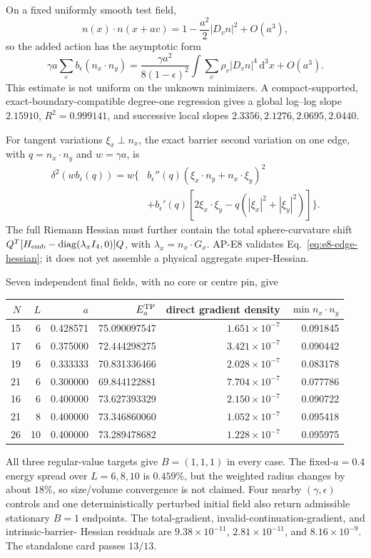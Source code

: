 \documentclass[11pt]{article}
\numberwithin{equation}{section}
\newcommand{\dd}{\mathrm d}
\begin{document}
On a fixed uniformly smooth test field,
\begin{equation}
 n(x)\cdot n(x+av)=1-\frac{a^2}{2}|D_vn|^2+O(a^3),
\end{equation}
so the added action has the asymptotic form
\begin{equation}
 \gamma a\sum_e b_\epsilon(n_x\cdot n_y)
 =\frac{\gamma a^2}{8(1-\epsilon)^2}
 \int\sum_v\rho_v|D_vn|^4\,\dd^3x+O(a^3).
 \label{eq:e8-smooth-scaling}
\end{equation}
This estimate is not uniform on the unknown minimizers.  A compact-supported,
exact-boundary-compatible degree-one regression gives a global log--log slope
\(2.15910\), \(R^2=0.999141\), and successive local slopes
\(2.3356,2.1276,2.0695,2.0440\).

For tangent variations \(\xi_x\perp n_x\), the exact barrier second variation
on one edge, with \(q=n_x\cdot n_y\) and \(w=\gamma a\), is
\begin{align}
 \delta^2(wb_\epsilon(q))=w\{&b_\epsilon''(q)
 (\xi_x\cdot n_y+n_x\cdot\xi_y)^2\nonumber\\
 &+b_\epsilon'(q)[2\xi_x\cdot\xi_y
 -q(|\xi_x|^2+|\xi_y|^2)]\}.
 \label{eq:e8-edge-hessian}
\end{align}
The full Riemann Hessian must further contain the total sphere-curvature shift
\(Q^T[H_{\rm emb}-\operatorname{diag}(\lambda_xI_4,0)]Q\), with
\(\lambda_x=n_x\cdot G_x\).  AP-E8 validates
Eq.~\eqref{eq:e8-edge-hessian}; it does not yet assemble a physical aggregate
super-Hessian.

Seven independent final fields, with no core or centre pin, give
\begin{center}
\small
\begin{tabular}{rrrrrr}
\toprule
\(N\)&\(L\)&\(a\)&\(E_a^{\rm TP}\)&direct gradient density&\(\min n_x\cdot n_y\)\\
\midrule
15&6&0.428571&75.090097547&\(1.651\times10^{-7}\)&0.091845\\
17&6&0.375000&72.444298275&\(3.421\times10^{-7}\)&0.090442\\
19&6&0.333333&70.831336466&\(2.028\times10^{-7}\)&0.083178\\
21&6&0.300000&69.844122881&\(7.704\times10^{-7}\)&0.077786\\
16&6&0.400000&73.627393329&\(2.150\times10^{-7}\)&0.090722\\
21&8&0.400000&73.346860060&\(1.052\times10^{-7}\)&0.095418\\
26&10&0.400000&73.289478682&\(1.228\times10^{-7}\)&0.095975\\
\bottomrule
\end{tabular}
\end{center}
All three regular-value targets give \(B=(1,1,1)\) in every case.  The
fixed-\(a=0.4\) energy spread over \(L=6,8,10\) is \(0.459\%\), but the
weighted radius changes by about \(18\%\), so size/volume convergence is not
claimed.  Four nearby \((\gamma,\epsilon)\) controls and one deterministically
perturbed initial field also return admissible stationary \(B=1\) endpoints.
The total-gradient, invalid-continuation-gradient, and intrinsic-barrier-
Hessian residuals are \(9.38\times10^{-11}\), \(2.81\times10^{-11}\), and
\(8.16\times10^{-9}\).  The standalone card passes \(13/13\).
\end{document}
